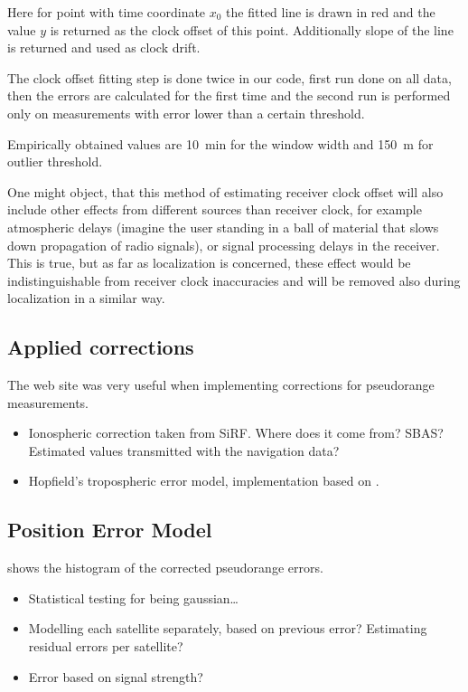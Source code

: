 Here for point with time coordinate \(x_0\) the fitted line is drawn in red
and the value \(y\) is returned as the clock offset of this point.
Additionally slope of the line is returned and used as clock drift.

The clock offset fitting step is done twice in our code, first run done on
all data, then the errors are calculated for the first time and the second run
is performed only on measurements with error lower than a certain threshold.

Empirically obtained values are \SI{10}{\minute} for the window width and
\SI{150}{\meter} for outlier threshold.

One might object, that this method of estimating receiver clock offset will
also include other effects from different sources than receiver clock,
for example atmospheric delays (imagine the user standing in a ball of material
that slows down propagation of radio signals), or signal processing delays
in the receiver.
This is true, but as far as localization is concerned, these effect would
be indistinguishable from receiver clock inaccuracies and will be
removed also during localization in a similar way.

\subsection{Applied corrections}
The web site \cite{sam-www} was very useful when implementing corrections for
pseudorange measurements.

\begin{itemize}
\item Ionospheric correction taken from SiRF. Where does it come from? SBAS?
    Estimated values transmitted with the navigation data?
\item Hopfield's tropospheric error model, implementation based on \cite{sam-www}.
\end{itemize}

\subsection{Position Error Model}
 shows the histogram of the corrected pseudorange
errors.
\begin{itemize}
\item Statistical testing for being gaussian\ldots
\item Modelling each satellite separately, based on previous error?
      Estimating residual errors per satellite?
\item Error based on signal strength?
\end{itemize}

